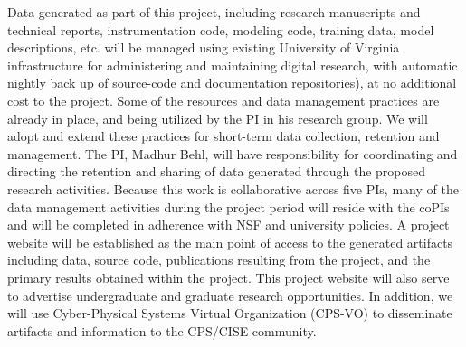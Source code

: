 
Data generated as part of this project, including research manuscripts and technical reports, instrumentation code, modeling code, training data, model descriptions, etc. will be managed using existing University of Virginia infrastructure for administering and maintaining digital research, with automatic nightly back up of source-code and documentation repositories), at no additional cost to the project. Some of the resources and data management practices are already in place, and being utilized by the PI in his research group. We will adopt and extend these practices for short-term data collection, retention and management. 
The PI, Madhur Behl, will have responsibility for coordinating and directing the retention and sharing of data generated through the proposed research activities. Because this work is collaborative across five PIs, many of the data management activities during the project period will reside with the coPIs and will be completed in adherence with NSF and university policies. 
A project website will be established as the main point of access to the generated artifacts including data, source code, publications resulting from the project, and the primary results obtained within the project. This project website will also serve to advertise undergraduate and graduate research opportunities. In addition, we will use Cyber-Physical Systems Virtual Organization (CPS-VO) to disseminate artifacts and information to the CPS/CISE community. 

